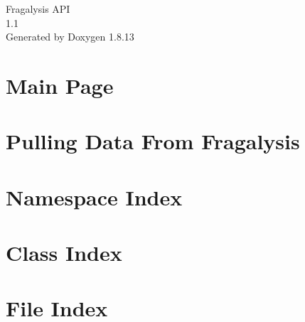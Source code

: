 \documentclass[twoside]{book}
\newcommand{\+}{\discretionary{\mbox{\scriptsize$\hookleftarrow$}}{}{}}
\newcommand{\clearemptydoublepage}{%
  \newpage{\pagestyle{empty}\cleardoublepage}%
}
\begin{document}
\hypersetup{pageanchor=false,
             bookmarksnumbered=true,
             pdfencoding=unicode
            }
\begin{titlepage}
\vspace*{7cm}
\begin{center}%
{\Large Fragalysis A\+PI \\[1ex]\large 1.\+1 }\\
\vspace*{1cm}
{\large Generated by Doxygen 1.8.13}\\
\end{center}
\end{titlepage}
\clearemptydoublepage
{}
\tableofcontents
\clearemptydoublepage
{}
\hypersetup{pageanchor=true}

\chapter{Main Page}
\label{index}\hypertarget{index}{}
\chapter{Pulling Data From Fragalysis}
\label{autotoc_md9}

\chapter{Namespace Index}

\chapter{Class Index}

\chapter{File Index}

\end{document}
